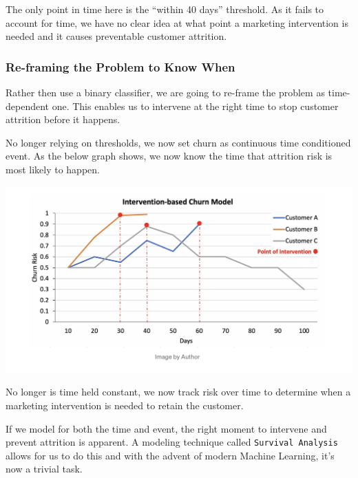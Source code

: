 \documentclass[
]{book}
\begin{document}
The only point in time here is the ``within 40 days'' threshold. As it fails to account for time, we have no clear idea at what point a marketing intervention is needed and it causes preventable customer attrition.

\hypertarget{re-framing-the-problem-to-know-when}{%
\subsubsection{Re-framing the Problem to Know When}\label{re-framing-the-problem-to-know-when}}

Rather then use a binary classifier, we are going to re-frame the problem as time-dependent one. This enables us to intervene at the right time to stop customer attrition before it happens.

No longer relying on thresholds, we now set churn as continuous time conditioned event. As the below graph shows, we now know the time that attrition risk is most likely to happen.

\includegraphics{figs/churn2.png}

No longer is time held constant, we now track risk over time to determine when a marketing intervention is needed to retain the customer.

If we model for both the time and event, the right moment to intervene and prevent attrition is apparent. A modeling technique called \texttt{Survival\ Analysis} allows for us to do this and with the advent of modern Machine Learning, it's now a trivial task.
\end{document}
